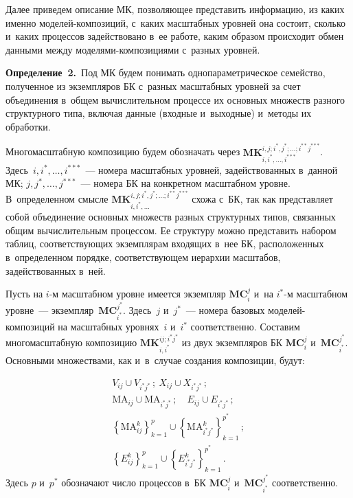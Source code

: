 \begin{multicols}{2}
   Далее приведем описание МК, позволяющее 
представить информацию, из каких именно мо\-де\-лей-ком\-по\-зи\-ций, с~каких 
масштабных уровней она состоит, сколько и~каких процессов задействовано в~ее 
работе, каким образом происходит обмен данными между  
мо\-де\-ля\-ми-ком\-по\-зи\-ци\-ями с~разных уровней.
   
   \smallskip
   
   \noindent
   \textbf{Определение~2.}\ Под МК будем 
понимать однопараметрическое семейство, полученное из экземпляров БК 
с~разных масштабных уровней за счет объединения в~общем вычислительном 
процессе их основных множеств разного структурного типа, включая данные 
(входные и~выходные) и~методы их обработки.
   
   Многомасштабную композицию 
   будем обозначать через 
   $\mathbf{MK}_{i,i^*, \ldots , 
   i^{***}}^{i,j;i^*, j^*;\ldots; i^{**}j^{***}}$. Здесь~$i, i^*,\ldots , i^{***}$~--- 
номера масштабных уровней, задействованных в~данной МК; $j, j^*, \ldots , 
j^{***}$~--- номера БК на конкретном масштабном уровне. В~определенном 
смысле $\mathbf{MK}_{i, i^*,\ldots}^{i,j; i^*, j^*; \ldots; i^{**}j^{***}}$ схожа 
с~БК, так как представляет собой объединение основных множеств разных 
структурных типов, связанных общим вычислительным процессом. Ее структуру 
можно представить набором таб\-лиц, соответствующих экземплярам входящих 
в~нее БК, расположенных в~определенном порядке, соответствующем иерархии 
масштабов, задействованных в~ней.
   
   Пусть на $i$-м масштабном уровне имеется экземпляр $\mathbf{MC}_i^j$ 
и~на $i^*$-м масштабном уровне~--- экземпляр~$\mathbf{MC}_{i^*}^{j^*}$. 
Здесь~$j$ и~$j^*$~--- номера базовых мо\-де\-лей-ком\-по\-зи\-ций на масштабных 
уровнях~$i$ и~$i^*$ соответственно. Составим многомасштабную композицию 
$\mathbf{MK}_{i,i^*}^{ij;i^*j^*}$ из двух экземпляров БК
$\mathbf{MC}_i^j$ и~$\mathbf{MC}^{j^*}_{i^*}$. Основными множествами, как 
и~в~случае создания композиции, будут:

\noindent
   \begin{gather*} 
   V_{ij} \cup V_{i^*j^*}\,;\ X_{ij}\cup X_{i^*j^*}\,;\\
   \mathrm{MA}_{ij}\cup \mathrm{MA}_{i^*j^*}\,;\quad
   E_{ij}\cup E_{i^*j^*}\,;\\
   \left\{ 
\mathrm{MA}_{ij}^k\right\}^p_{k=1}\cup \left\{ \mathrm{MA}^k_{i^*j^*}\right\}^{p^*}_{k=1}\,;\\
   \left\{ E^k_{ij}\right\}^p_{k=1}\cup \left\{ E^k_{i^*j^*}\right\}_{k=1}^{p^*}\,.
   \end{gather*}
   Здесь $p$ и~$p^*$ обозначают число процессов в~БК
$\mathbf{MC}_i^j$ и~$\mathbf{MC}_{i^*}^{j^*}$ соответственно.
   

\end{multicols}
